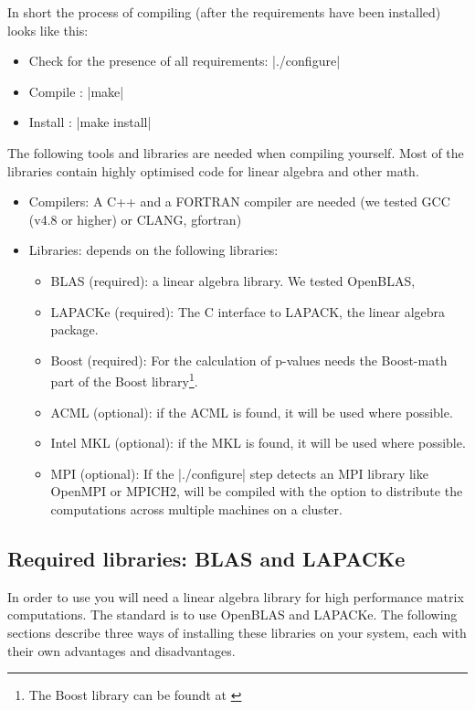 In short the process of compiling \oanomm (after the requirements have
been installed) looks like this:
\begin{itemize}
\item Check for the presence of all requirements: |./configure|
\item Compile \oanomm: |make|
\item Install \oanomm: |make install|
\end{itemize}

The following tools and libraries are needed when compiling \oanomm
yourself. Most of the libraries contain highly optimised code for
linear algebra and other math.
\begin{itemize}
\item Compilers: A C++ and a FORTRAN compiler are needed (we tested
  GCC (v4.8 or higher) or CLANG, gfortran)
\item Libraries: \oanomm depends on the following libraries:
  \begin{itemize}
  \item \acs{BLAS} (required): a linear algebra library. We tested OpenBLAS,
  \item LAPACKe (required): The C interface to LAPACK, the linear
    algebra package.
  \item Boost (required): For the calculation of p-values \oanomm needs the
    Boost-math part of the Boost library\footnote{The Boost library
      can be foundt at \url{}}.
  \item \ac{ACML} (optional): if the \ac{ACML} is found,
    it will be used where possible.
  \item Intel \ac{MKL} (optional): if the \ac{MKL} is
    found, it will be used where possible.
  \item \acs{MPI} (optional): If the |./configure| step detects an
    \acf{MPI} library like OpenMPI or MPICH2, \oanomm will be compiled
    with the option to distribute the computations across multiple
    machines on a cluster.
  \end{itemize}
\end{itemize}


\subsection{Required libraries: \ac{BLAS} and LAPACKe}
In order to use \oanomm you will need a linear algebra library for
high performance matrix computations. The standard is to use OpenBLAS
and LAPACKe. The following sections describe three ways of installing
these libraries on your system, each with their own advantages and
disadvantages.

